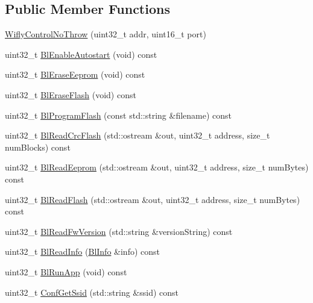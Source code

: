 \subsection*{Public Member Functions}
\begin{DoxyCompactItemize}
\item 
\hyperlink{class_wifly_control_no_throw_a716d1c0768041b880205838c09999284}{Wifly\-Control\-No\-Throw} (uint32\-\_\-t addr, uint16\-\_\-t port)
\item 
uint32\-\_\-t \hyperlink{class_wifly_control_no_throw_a4c35f2535eb1f14e30f631fada8a5497}{Bl\-Enable\-Autostart} (void) const 
\item 
uint32\-\_\-t \hyperlink{class_wifly_control_no_throw_aedb987e1add91290d62e33bdf638b79e}{Bl\-Erase\-Eeprom} (void) const 
\item 
uint32\-\_\-t \hyperlink{class_wifly_control_no_throw_a1d0dffa11f76b27385052fe1927d29c5}{Bl\-Erase\-Flash} (void) const 
\item 
uint32\-\_\-t \hyperlink{class_wifly_control_no_throw_ad02f390c7b5e3dc81b22aaf70218fd5d}{Bl\-Program\-Flash} (const std\-::string \&filename) const 
\item 
uint32\-\_\-t \hyperlink{class_wifly_control_no_throw_a9267651f26444d43967a7653e9fc2c97}{Bl\-Read\-Crc\-Flash} (std\-::ostream \&out, uint32\-\_\-t address, size\-\_\-t num\-Blocks) const 
\item 
uint32\-\_\-t \hyperlink{class_wifly_control_no_throw_aba9249f26f98e16bde7df538e4cc8b65}{Bl\-Read\-Eeprom} (std\-::ostream \&out, uint32\-\_\-t address, size\-\_\-t num\-Bytes) const 
\item 
uint32\-\_\-t \hyperlink{class_wifly_control_no_throw_a9b854767640d540c0ec48d9683da4436}{Bl\-Read\-Flash} (std\-::ostream \&out, uint32\-\_\-t address, size\-\_\-t num\-Bytes) const 
\item 
uint32\-\_\-t \hyperlink{class_wifly_control_no_throw_a997dec8e65fb166ac8640f44c0443035}{Bl\-Read\-Fw\-Version} (std\-::string \&version\-String) const 
\item 
uint32\-\_\-t \hyperlink{class_wifly_control_no_throw_a323797a3fdc5f2bfde6b4f504f3828fb}{Bl\-Read\-Info} (\hyperlink{struct_bl_info}{Bl\-Info} \&info) const 
\item 
uint32\-\_\-t \hyperlink{class_wifly_control_no_throw_a6692124924a54cb2e9b6a1b92824b0ce}{Bl\-Run\-App} (void) const 
\item 
uint32\-\_\-t \hyperlink{class_wifly_control_no_throw_aecc9be414c20860f23e03c238c8a7f71}{Conf\-Get\-Ssid} (std\-::string \&ssid) const 

\end{DoxyCompactItemize}
